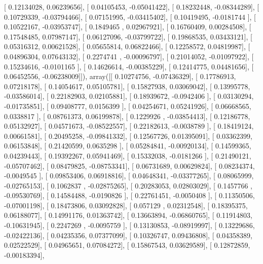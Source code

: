 \documentclass{article}
\begin{document}
       [ 0.12134028,  0.06239656],
       [ 0.04105453, -0.05041422],
       [ 0.18232448, -0.08344289],
       [ 0.10729339, -0.03794466],
       [ 0.07151995, -0.03415402],
       [ 0.10419495, -0.0181744 ],
       [ 0.10522167, -0.03953747],
       [ 0.1849465 ,  0.02967921],
       [ 0.16760409,  0.00284508],
       [ 0.17548485,  0.07987147],
       [ 0.06127096, -0.03799722],
       [ 0.19868535,  0.03433121],
       [ 0.05316312,  0.00621528],
       [ 0.05655814,  0.06822466],
       [ 0.12258572,  0.04819987],
       [ 0.04896304,  0.07643132],
       [ 0.2274741 , -0.00096797],
       [ 0.21014052, -0.01097922],
       [ 0.15234616, -0.0101165 ],
       [ 0.14626614, -0.00385229],
       [ 0.12414775,  0.04481656],
       [ 0.06452556, -0.06238009]]), array([[ 0.10274756, -0.07436329],
       [ 0.17786913,  0.07218178],
       [ 0.14054617,  0.05105781],
       [ 0.15827938,  0.03069042],
       [ 0.13995778, -0.03586014],
       [ 0.22182903,  0.02105881],
       [ 0.18939672, -0.0942406 ],
       [ 0.03130294, -0.01735851],
       [ 0.09408777,  0.0156399 ],
       [ 0.04254671,  0.05241926],
       [ 0.06668565,  0.0338817 ],
       [ 0.08761373,  0.06199878],
       [ 0.1229926 , -0.03854413],
       [ 0.12186778,  0.05132927],
       [ 0.04571673, -0.08522557],
       [ 0.22182613, -0.0038789 ],
       [ 0.18419124,  0.00661581],
       [ 0.20495258, -0.09841332],
       [ 0.12567726,  0.01395091],
       [ 0.03362399,  0.06153848],
       [ 0.21420599,  0.0635298 ],
       [ 0.05284841, -0.00920134],
       [ 0.14599365,  0.04239443],
       [ 0.19392267,  0.05941469],
       [ 0.15332038, -0.0181266 ],
       [ 0.21490121, -0.05707462],
       [ 0.08479825, -0.08753341],
       [ 0.06731689,  0.00629824],
       [ 0.08234374, -0.0049545 ],
       [ 0.09853406,  0.06918816],
       [ 0.04648341, -0.03377265],
       [ 0.08065999, -0.02765153],
       [ 0.1062837 , -0.02875265],
       [ 0.20283053,  0.02803029],
       [ 0.1457766 , -0.09530769],
       [ 0.14584488, -0.0190826 ],
       [ 0.22761451, -0.0050408 ],
       [ 0.11350506, -0.07001198],
       [ 0.18473806,  0.03092828],
       [ 0.057129  ,  0.02312548],
       [ 0.18395375,  0.06188077],
       [ 0.14991176,  0.01363742],
       [ 0.13663894, -0.06860765],
       [ 0.11914803, -0.10631945],
       [ 0.2247269 , -0.0095759 ],
       [ 0.13130853, -0.08919997],
       [ 0.13229686, -0.02422136],
       [ 0.04235356,  0.07377099],
       [ 0.10326747,  0.09436808],
       [ 0.04358389,  0.02522529],
       [ 0.04965651,  0.07084272],
       [ 0.15867543,  0.03629589],
       [ 0.12872859, -0.00183394],
\end{document}
